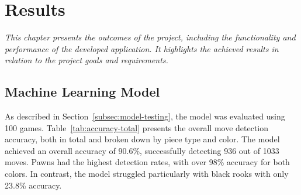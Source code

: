 \chapter{Results}


\begin{center}
    \textit{This chapter presents the outcomes of the project, including the functionality and performance of the developed application. It highlights the achieved results in relation to the project goals and requirements.}
\end{center}

\section{Machine Learning Model}

As described in Section~\ref{subsec:model-testing}, the model was evaluated using 100 games. Table~\ref{tab:accuracy-total} presents the overall move detection accuracy, both in total and broken down by piece type and color. The model achieved an overall accuracy of 90.6\%, successfully detecting 936 out of 1033 moves. Pawns had the highest detection rates, with over 98\% accuracy for both colors. In contrast, the model struggled particularly with black rooks with only 23.8\% accuracy.


